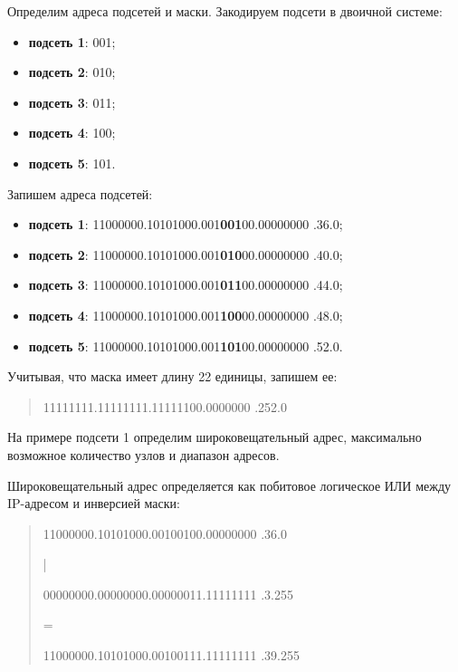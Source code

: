 \documentclass[a4paper, 14pt]{extarticle}
\begin{document}
Определим адреса подсетей и маски. Закодируем подсети в двоичной системе:
\begin{itemize}
  \item \textbf{подсеть 1}: 001;
  \item \textbf{подсеть 2}: 010;
  \item \textbf{подсеть 3}: 011;
  \item \textbf{подсеть 4}: 100;
  \item \textbf{подсеть 5}: 101.
\end{itemize}

Запишем адреса подсетей:
\begin{itemize}
  \item \textbf{подсеть 1}: 11000000.10101000.001\textbf{001}00.00000000 .36.0;
  \item \textbf{подсеть 2}: 11000000.10101000.001\textbf{010}00.00000000 .40.0;
  \item \textbf{подсеть 3}: 11000000.10101000.001\textbf{011}00.00000000 .44.0;
  \item \textbf{подсеть 4}: 11000000.10101000.001\textbf{100}00.00000000 .48.0;
  \item \textbf{подсеть 5}: 11000000.10101000.001\textbf{101}00.00000000 .52.0.
\end{itemize}

Учитывая, что маска имеет длину 22 единицы, запишем ее:

\begin{quotation}
  11111111.11111111.11111100.0000000 .252.0
\end{quotation}

На примере подсети 1 определим широковещательный адрес, максимально возможное
количество узлов и диапазон адресов.

Широковещательный адрес определяется как побитовое логическое ИЛИ между
IP-адресом и инверсией маски:

\begin{quotation}
  11000000.10101000.00100100.00000000 .36.0

  \qquad \qquad \qquad \qquad |

  00000000.00000000.00000011.11111111 \qquad {}.3.255

  \qquad \qquad \qquad \qquad =

  11000000.10101000.00100111.11111111 \qquad {}.39.255
\end{quotation}
\end{document}
